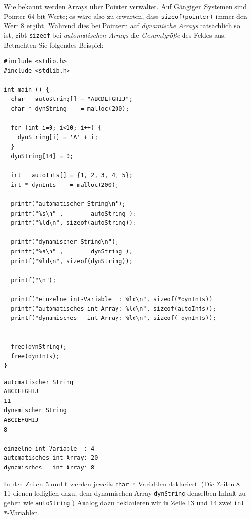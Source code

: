 Wie bekannt werden Arrays über Pointer verwaltet. Auf Gängigen Systemen sind Pointer 64-bit-Werte; es wäre also zu erwarten, dass \texttt{sizeof(pointer)} immer den Wert 8 ergibt. Während dies bei Pointern auf \emph{dynamische Arrays} tatsächlich so ist, gibt \texttt{sizeof} bei \emph{automatischen Arrays} die \emph{Gesamtgröße} des Feldes aus. Betrachten Sie folgendes Beispiel:

\begin{codebox}
\begin{verbatim}
#include <stdio.h>
#include <stdlib.h>

int main () {
  char   autoString[] = "ABCDEFGHIJ";
  char * dynString    = malloc(200);
  
  for (int i=0; i<10; i++) {
    dynString[i] = 'A' + i;
  }
  dynString[10] = 0;
  
  int   autoInts[] = {1, 2, 3, 4, 5};
  int * dynInts    = malloc(200);
  
  printf("automatischer String\n");
  printf("%s\n" ,        autoString );
  printf("%ld\n", sizeof(autoString));
  
  printf("dynamischer String\n");
  printf("%s\n" ,        dynString );
  printf("%ld\n", sizeof(dynString));
  
  printf("\n");
  
  printf("einzelne int-Variable  : %ld\n", sizeof(*dynInts))
  printf("automatisches int-Array: %ld\n", sizeof(autoInts));
  printf("dynamisches   int-Array: %ld\n", sizeof( dynInts));
  
  
  free(dynString);
  free(dynInts);
}
\end{verbatim}
\end{codebox}

\begin{cmdbox}
\begin{verbatim}
automatischer String
ABCDEFGHIJ
11
dynamischer String
ABCDEFGHIJ
8

einzelne int-Variable  : 4
automatisches int-Array: 20
dynamisches   int-Array: 8
\end{verbatim}
\end{cmdbox}

In den Zeilen 5 und 6 werden jeweils \texttt{char *}-Variablen deklariert. (Die Zeilen 8-11 dienen lediglich dazu, dem dynamischen Array \texttt{dynString} denselben Inhalt zu geben wie \texttt{autoString}.) Analog dazu deklarieren wir in Zeile 13 und 14 zwei \texttt{int *}-Variablen.

